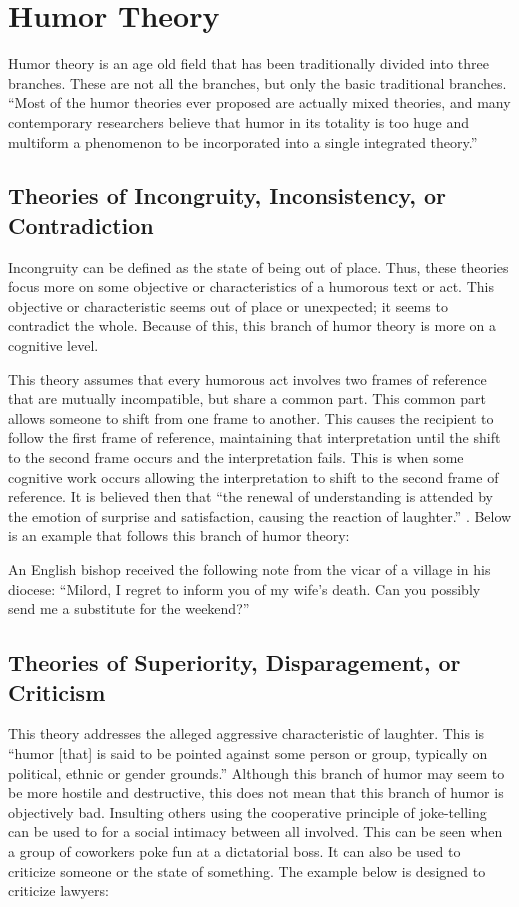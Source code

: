 \section{Humor Theory}
Humor theory is an age old field that has been traditionally divided into three branches. These are not all the branches, but only the basic traditional branches. ``Most of the humor theories ever proposed are actually mixed theories, and many contemporary researchers believe that humor in its totality is too huge and multiform a phenomenon to be incorporated into a single integrated theory.'' \cite{humor_theory} 

\subsection{Theories of Incongruity, Inconsistency, or Contradiction} 
Incongruity can be defined as the state of being out of place. Thus, these theories focus more on some objective or characteristics of a humorous text or act. This objective or characteristic seems out of place or unexpected; it seems to contradict the whole. Because of this, this branch of humor theory is more on a cognitive level.

This theory assumes that every humorous act involves two frames of reference that are mutually incompatible, but share a common part. This common part allows someone to shift from one frame to another. This causes the recipient to follow the first frame of reference, maintaining that interpretation until the shift to the second frame occurs and the interpretation fails. This is when some cognitive work occurs allowing the interpretation to shift to the second frame of reference. It is believed then that ``the renewal of understanding is attended by the emotion of surprise and satisfaction, causing the reaction of laughter.'' \cite{humor_theory}. Below is an example that follows this branch of humor theory:

An English bishop received the following note from the vicar of a village in his diocese: ``Milord, I regret to inform you of my wife's death. Can you possibly send me a substitute for the weekend?''\cite{humor_theory}

\subsection{Theories of Superiority, Disparagement, or Criticism}
This theory addresses the alleged aggressive characteristic of laughter. This is ``humor [that] is said to be pointed against some person or group, typically on political, ethnic or gender grounds.'' Although this branch of humor may seem to be more hostile and destructive, this does not mean that this branch of humor is objectively bad. Insulting others using the cooperative principle of joke-telling can be used to for a social intimacy between all involved. This can be seen when a group of coworkers poke fun at a dictatorial boss. It can also be used to criticize someone or the state of something. The example below is designed to criticize lawyers:

